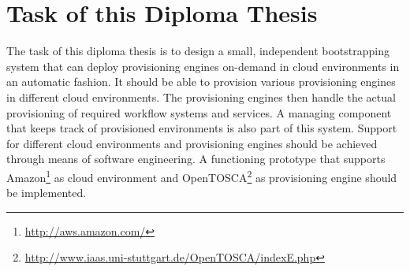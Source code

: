 \section{Task of this Diploma Thesis}

The task of this diploma thesis is to design a small, independent bootstrapping system that can deploy provisioning engines on-demand in cloud environments in an automatic fashion.
It should be able to provision various provisioning engines in different cloud environments.
The provisioning engines then handle the actual provisioning of required workflow systems and services.
A managing component that keeps track of provisioned environments is also part of this system.
Support for different cloud environments and provisioning engines should be achieved through means of software engineering.
A functioning prototype that supports Amazon\footnote{\url{http://aws.amazon.com/}} as cloud environment and OpenTOSCA\footnote{\url{http://www.iaas.uni-stuttgart.de/OpenTOSCA/indexE.php}} as provisioning engine should be implemented.
